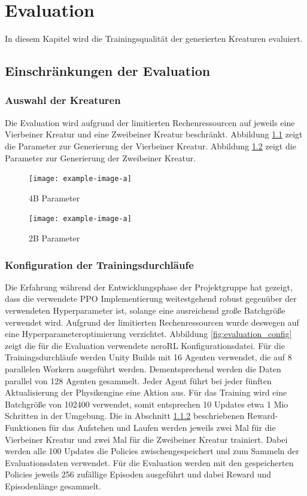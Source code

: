 \chapter{Evaluation}
\label{chap:evaluation}
In diesem Kapitel wird die Trainingsqualität der generierten Kreaturen evaluiert. 

\section{Einschränkungen der Evaluation}

\subsection{Auswahl der Kreaturen}
Die Evaluation wird aufgrund der limitierten Rechenressourcen auf jeweils eine Vierbeiner Kreatur und eine Zweibeiner Kreatur beschränkt. Abbildung \ref{fig:4B_creature_settings} zeigt die Parameter zur Generierung der Vierbeiner Kreatur. Abbildung \ref{fig:2B_creature_settings} zeigt die Parameter zur Generierung der Zweibeiner Kreatur.

\begin{figure}[ht]
    \centering
    \texttt{[image: example-image-a]}
    \caption{4B Parameter}\label{fig:4B_creature_settings}
\end{figure}

\begin{figure}[ht]
    \centering
    \texttt{[image: example-image-a]}
    \caption{2B Parameter}\label{fig:2B_creature_settings}
\end{figure}

\subsection{Konfiguration der Trainingsdurchläufe}
Die Erfahrung während der Entwicklungsphase der Projektgruppe hat gezeigt, dass die verwendete PPO Implementierung weitestgehend robust gegenüber der verwendeten Hyperparameter ist, solange eine ausreichend große Batchgröße verwendet wird. Aufgrund der limitierten Rechenressourcen wurde deswegen auf eine Hyperparameteroptimierung verzichtet. Abbildung \ref{fig:evaluation_config} zeigt die für die Evaluation verwendete neroRL Konfigurationsdatei. 
Für die Trainingsdurchläufe werden Unity Builds mit 16 Agenten verwendet, die auf 8 parallelen Workern ausgeführt werden. Dementsprechend werden die Daten parallel von 128 Agenten gesammelt. Jeder Agent führt bei jeder fünften Aktualisierung der Physikengine eine Aktion aus. Für das Training wird eine Batchgröße von 102400 verwendet, somit entsprechen 10 Updates etwa 1 Mio Schritten in der Umgebung.
Die in Abschnitt \ref{} beschriebenen Reward-Funktionen für das Aufstehen und Laufen werden jeweils zwei Mal für die Vierbeiner Kreatur und zwei Mal für die Zweibeiner Kreatur trainiert. Dabei werden alle 100 Updates die Policies zwischengespeichert und zum Sammeln der Evaluationsdaten verwendet. Für die Evaluation werden mit den gespeicherten Policies jeweils 256 zufällige Episoden ausgeführt und dabei Reward und Episodenlänge gesammelt.

